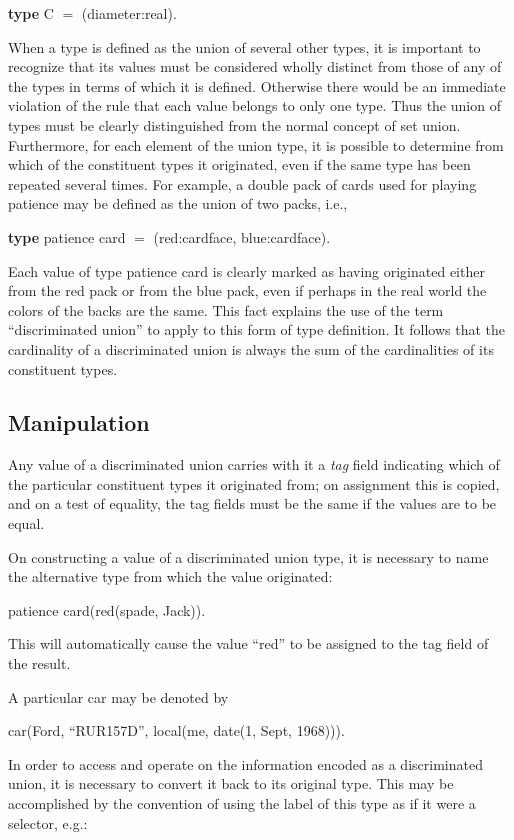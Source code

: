 \quad \textbf{type} C $=$ (diameter:real).

When a type is defined as the union of several other types, it is important to recognize that its values must be considered wholly distinct from those of any of the types in terms of which it is defined. Otherwise there would be an immediate violation of the rule that each value belongs to only one type. Thus the union of types must be clearly distinguished from the normal concept of set union. Furthermore, for each element of the union type, it is possible to determine from which of the constituent types it originated, even if the same type has been repeated several times. For example, a double pack of cards used for playing patience may be defined as the union of two packs, i.e.,

\quad \textbf{type} patience card $=$ (red:cardface, blue:cardface).

\noindent
Each value of type patience card is clearly marked as having originated either from the red pack or from the blue pack, even if perhaps in the real world the colors of the backs are the same. This fact explains the use of the term ``discriminated union'' to apply to this form of type definition. It follows that the cardinality of a discriminated union is always the sum of the cardinalities of its constituent types.

\subsection{Manipulation}

Any value of a discriminated union carries with it a \textit{tag} field indicating which of the particular constituent types it originated from; on assignment this is copied, and on a test of equality, the tag fields must be the same if the values are to be equal.

On constructing a value of a discriminated union type, it is necessary to name the alternative type from which the value originated:
\smallskip

\quad patience card(red(spade, Jack)).
\smallskip

\noindent
This will automatically cause the value ``red'' to be assigned to the tag field of the result.

A particular car may be denoted by
\smallskip

\quad car(Ford, ``RUR157D'', local(me, date(1, Sept, 1968))).
\smallskip

In order to access and operate on the information encoded as a discriminated union, it is necessary to convert it back to its original type. This may be accomplished by the convention of using the label of this type as if it were a selector, e.g.:

